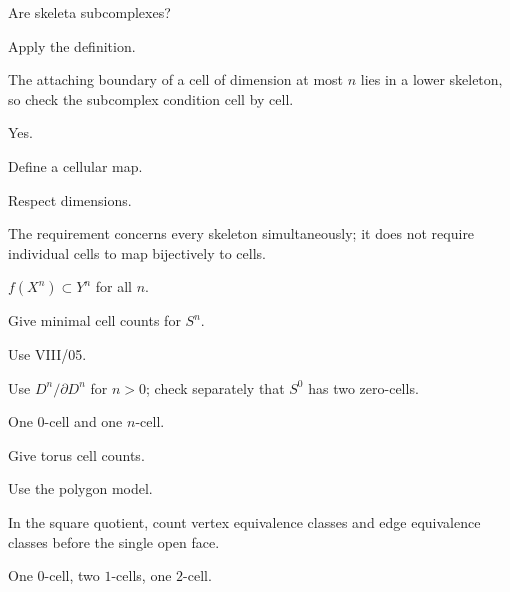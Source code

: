 \begin{exercise}\label{exr:viii06-11}
Are skeleta subcomplexes?
\end{exercise}
\begin{hint}
Apply the definition.

The attaching boundary of a cell of dimension at most \(n\) lies in a lower skeleton, so check the subcomplex condition cell by cell.
\end{hint}
\begin{solution}
Yes.
\end{solution}

\begin{exercise}\label{exr:viii06-12}
Define a cellular map.
\end{exercise}
\begin{hint}
Respect dimensions.

The requirement concerns every skeleton simultaneously; it does not require individual cells to map bijectively to cells.
\end{hint}
\begin{solution}
\(f(X^n)\subset Y^n\) for all \(n\).
\end{solution}

\begin{exercise}\label{exr:viii06-13}
Give minimal cell counts for \(S^n\).
\end{exercise}
\begin{hint}
Use VIII/05.

Use \(D^n/\partial D^n\) for \(n>0\); check separately that \(S^0\) has two zero-cells.
\end{hint}
\begin{solution}
One \(0\)-cell and one \(n\)-cell.
\end{solution}

\begin{exercise}\label{exr:viii06-14}
Give torus cell counts.
\end{exercise}
\begin{hint}
Use the polygon model.

In the square quotient, count vertex equivalence classes and edge equivalence classes before the single open face.
\end{hint}
\begin{solution}
One \(0\)-cell, two \(1\)-cells, one \(2\)-cell.
\end{solution}

